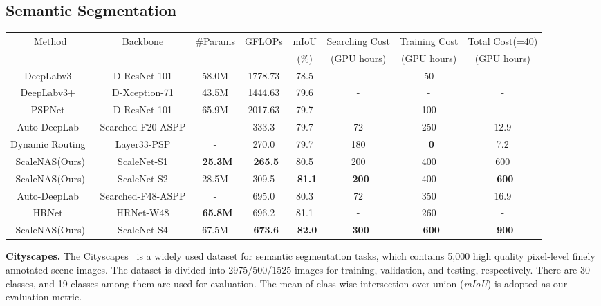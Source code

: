 \documentclass[final]{cvpr}
\newcommand{\workname}{ScaleNAS\xspace}
\newcommand{\netname}{ScaleNet\xspace}
\begin{document}
\subsection{Semantic Segmentation}
\label{sec:semantic_seg}
\begin{table*}
\centering
\caption{Semantic segmentation results on Cityscapes \textit{val} (single scale and no flipping). The GFLOPs is calculated on the input size 1024 × 2048. `D-X' equals to `Dilated-X'. For existing segmentation NAS works, the total cost grows linear to the number of deployment scenarios , while the cost of our \workname remains constant.} 
\setlength{\tabcolsep}{4pt}
\small
\begin{tabular}{c||c|c|c|c||c|c|c} 
\hline
\multirow{2}{*}{Method}   & \multirow{2}{*}{Backbone} &  \multirow{2}{*}{\#Params}  & \multirow{2}{*}{GFLOPs} & mIoU  & Searching Cost & Training Cost & Total Cost(=40)        \\ 
   &  &   &  & (\%)  & (GPU hours) & (GPU hours) & (GPU hours)      \\ 
\hline \hline
DeepLabv3~\cite{chen2017rethinking} & D-ResNet-101 &  58.0M &  1778.73 &  78.5 & - & 50 & - \\
DeepLabv3+~\cite{chen2018encoder}& D-Xception-71 &  43.5M &  1444.63 &  79.6 & - & - & - \\
PSPNet~\cite{zhao2017pyramid} & D-ResNet-101 &  65.9M &  2017.63 &  79.7 & - & 100 & - \\
Auto-DeepLab~\cite{liu2019auto} & Searched-F20-ASPP & - & 333.3 & 79.7 & 72 & 250 & 12.9 \\
Dynamic Routing~\cite{li2020learning} & Layer33-PSP & - & 270.0 & 79.7 & 180 & ~\textbf{0} & 7.2  \\
\workname(Ours) & \netname-S1   & ~\textbf{25.3M}    & ~\textbf{265.5}  & 80.5 & 200 &  400 & 600 \\
\workname(Ours) & \netname-S2   & 28.5M    & 309.5  & ~\textbf{81.1} & ~\textbf{200} &  400 & ~\textbf{600} \\
\hdashline
Auto-DeepLab~\cite{liu2019auto} & Searched-F48-ASPP & - & 695.0 & 80.3 & 72 & 350 & 16.9 \\
HRNet~\cite{wang2020deep}       & HRNet-W48       & ~\textbf{65.8M}  & 696.2  & 81.1  & - &  260  & -\\
\workname(Ours) & \netname-S4   & 67.5M                     & ~\textbf{673.6}  & ~\textbf{82.0} &  ~\textbf{300} & ~\textbf{600} & ~\textbf{900} \\

\hline
\end{tabular}
\label{tab:segmentation}
\end{table*}
\noindent\textbf{Cityscapes.} The Cityscapes~\cite{cordts2016cityscapes} is a widely used dataset for semantic segmentation tasks, which contains 5,000 high quality pixel-level finely annotated scene images. The dataset is divided into 2975/500/1525 images for training, validation, and testing, respectively. There are 30 classes, and 19 classes among them are used for evaluation. The mean of class-wise intersection over union (\textit{mIoU}) is adopted as our evaluation metric. 
\end{document}
